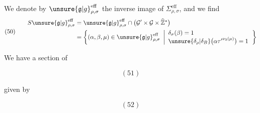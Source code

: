We denote by
\(\unsure{\mathfrak{g}|g}_{\rho,\sigma}^{\mathrm{eff}}\)
the inverse image of
\(\Sigma_{\rho,\sigma}^{\mathrm{eff}}\),
and we find
\[
(50)\qquad
\begin{aligned}
S\unsure{\mathfrak{g}|g}_{\rho,\sigma}^{\mathrm{eff}}
&=\unsure{\mathfrak{g}|g}_{\rho,\sigma}^{\mathrm{eff}}
\cap\bigl(\mathcal{G}'\times\mathcal{G}\times\widehat{\mathbb Z}^{*}\bigr)
\\
&=\left\{(\alpha,\beta,\mu)\in
\unsure{\mathfrak{g}|g}_{\rho,\sigma}^{\mathrm{eff}}
\ \left|
\begin{array}{l}
\delta_\sigma(\beta)=1\\
\unsure{\delta_\rho|\delta_B}\bigl(\alpha{\tau'}^{\nu_3(\mu)}\bigr)=1
\end{array}\right.\right\}
\end{aligned}
\]

We have a section of
\begin{samepage}
\[
(51)
\]
\end{samepage}

given by
\begin{samepage}
\[
(52)
\]
\end{samepage}

